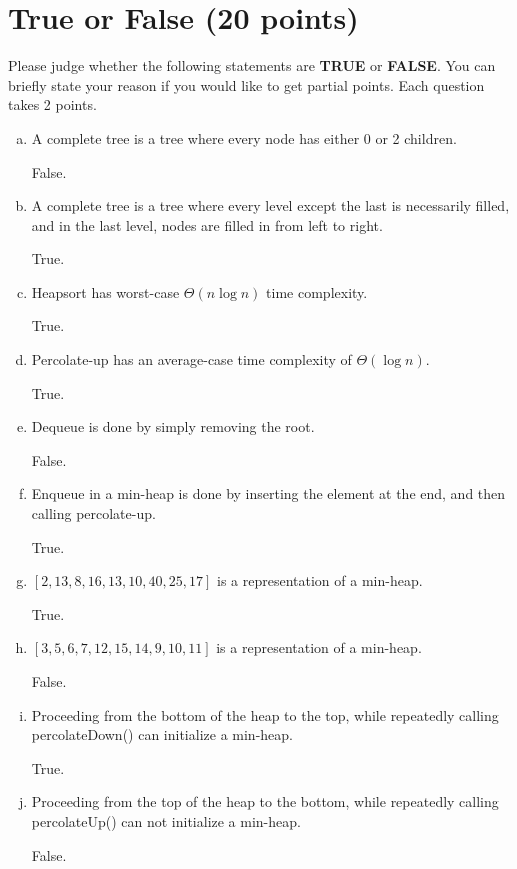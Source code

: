\documentclass[11pt]{exam}
\begin{document}
\section{True or False (20 points)}
Please judge whether the following statements are \textbf{TRUE} or \textbf{FALSE}. You can briefly state your reason if you would like to get partial points. Each question takes 2 points.
	\begin{enumerate}[a)]
		\item A complete tree is a tree where every node has either 0 or 2 children.
		\begin{solution}
False.
\end{solution}
		\item A complete tree is a tree where every level except the last is necessarily filled, and in the last level, nodes are filled in from left to right.
\begin{solution}
True.
\end{solution}
		\item Heapsort has worst-case $\Theta(n \log n)$ time complexity.
		\begin{solution}
True.
\end{solution}
		\item  Percolate-up has an average-case time complexity of $\Theta(\log n)$.
\begin{solution}
True.
\end{solution}
		\item Dequeue is done by simply removing the root.
\begin{solution}
False.
\end{solution}
		\item Enqueue in a min-heap is done by inserting the element at the end, and then calling percolate-up.
\begin{solution}
True.
\end{solution}
		\item $[2, 13, 8, 16,  13, 10, 40, 25, 17]$ is a representation of a min-heap.
\begin{solution}
True.
\end{solution}
		\item $[3, 5, 6, 7, 12, 15, 14, 9, 10, 11]$ is a representation of a min-heap.
\begin{solution}
False.
\end{solution}
		\item  Proceeding from the bottom of the heap to the top, while repeatedly calling percolateDown() can initialize a min-heap.
\begin{solution}
True.
\end{solution}
		\item Proceeding from the top of the heap to the bottom, while repeatedly calling percolateUp() can not initialize a min-heap.
		\begin{solution}
False.
\end{solution}
	\end{enumerate}
\end{document}
